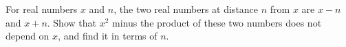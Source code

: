 For real numbers $x$ and $n$, the two real numbers at distance $n$ from $x$ are $x-n$ and $x+n$. Show that $x^2$ minus the product of these two numbers does not depend on $x$, and find it in terms of $n$.
